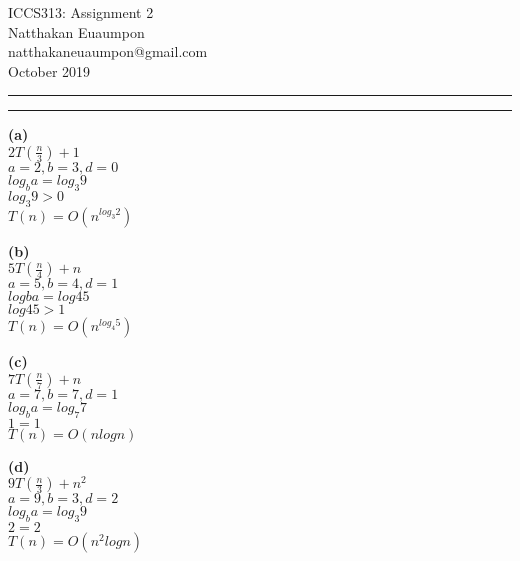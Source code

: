 \documentclass[a4paper, 11pt]{article}
\makeatletter
\newcommand{\question}[2] {\vspace{.25in} \hrule\vspace{0.5em}
\noindent{\bf #1: #2} \vspace{0.5em}
\hrule \vspace{.10in}}
\renewcommand{\part}[1] {\vspace{.10in} {\bf (#1)}}
\newcommand{\myname}{Natthakan Euaumpon}
\newcommand{\myemail}{natthakaneuaumpon@gmail.com}
\newcommand{\myhwnum}{2}
\makeatother
\begin{document}
\medskip                        %

\thispagestyle{plain}
\begin{center}                  %
{\Large ICCS313: Assignment \myhwnum} \\
\myname \\
\myemail \\
October 2019 \\
\end{center}

\question{1}{Part1}
\part{a}\\
$2T(\frac{n}{3})+1$\\
$a=2, b=3, d=0$\\
$log_{b}a = log_{3}9$\\
$log_{3}9 > 0$\\
$T(n)=O(n^{log_{3}2})$

\part{b}\\
$5T(\frac{n}{4})+n$\\
$a=5, b=4, d=1$\\
$log{b}a = log{4}5$\\
$log{4}5 > 1$\\
$T(n)=O(n^{log_{4}5})$

\part{c}\\
$7T(\frac{n}{7})+n$\\
$a=7, b=7, d=1$\\
$log_{b}a = log_{7}7$\\
$1 = 1$\\
$T(n)=O(nlogn)$

\part{d}\\
$9T(\frac{n}{3})+n^{2}$\\
$a=9, b=3, d=2$\\
$log_{b}a = log_{3}9$\\
$2 = 2$\\
$T(n)=O(n^{2}logn)$
\end{document}
